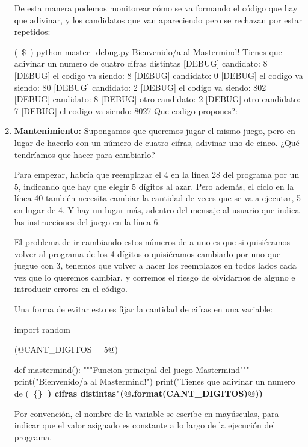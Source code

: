 \begin{enumerate}
De esta manera podemos monitorear cómo se va formando el código que hay que
adivinar, y los candidatos que van apareciendo pero se rechazan por estar
repetidos:

\begin{codigo-nohl-sn}
(~\$~) python master_debug.py
Bienvenido/a al Mastermind!
Tienes que adivinar un numero de cuatro cifras distintas
[DEBUG] candidato: 8
[DEBUG] el codigo va siendo: 8
[DEBUG] candidato: 0
[DEBUG] el codigo va siendo: 80
[DEBUG] candidato: 2
[DEBUG] el codigo va siendo: 802
[DEBUG] candidato: 8
[DEBUG] otro candidato: 2
[DEBUG] otro candidato: 7
[DEBUG] el codigo va siendo: 8027
Que codigo propones?:
\end{codigo-nohl-sn}

\item {\bf Mantenimiento:}
\label{str:mant}
Supongamos que queremos jugar el mismo juego, pero en lugar de hacerlo con un
número de cuatro cifras, adivinar uno de cinco. ¿Qué tendríamos que hacer para
cambiarlo?

Para empezar, habría que reemplazar el 4 en la línea 28 del programa por un
5, indicando que hay que elegir 5 dígitos al azar. Pero además, el ciclo en la
línea 40 también necesita cambiar la cantidad de veces que se va a ejecutar, 5
en lugar de 4. Y hay un lugar más, adentro del mensaje al usuario que indica las
instrucciones del juego en la línea 6.

El problema de ir cambiando estos números de a uno es que si quisiéramos volver
al programa de los 4 dígitos o quisiéramos cambiarlo por uno que juegue con 3,
tenemos que volver a hacer los reemplazos en todos lados cada vez que lo
queremos cambiar, y corremos el riesgo de olvidarnos de alguno e introducir
errores en el código.

Una forma de evitar esto es fijar la cantidad de cifras en una variable:

\begin{codigo-python-sn}
import random

(@CANT_DIGITOS = 5@)

def mastermind():
    """Funcion principal del juego Mastermind"""
    print("Bienvenido/a al Mastermind!")
    print("Tienes que adivinar un numero de (~\bfseries{\{\}}~) cifras distintas"(@.format(CANT_DIGITOS)@))
\end{codigo-python-sn}

Por convención, el nombre de la variable se escribe en mayúsculas, para indicar
que el valor asignado es constante a lo largo de la ejecución del programa.


\end{enumerate}
